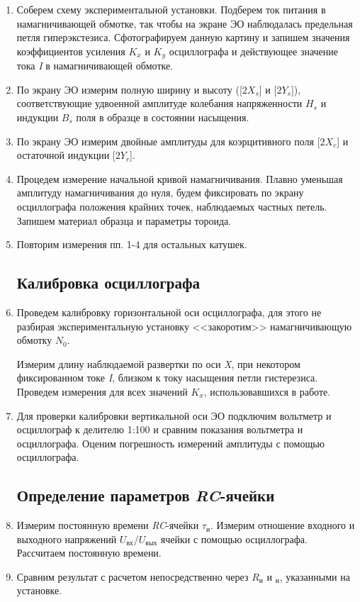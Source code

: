 \documentclass[a4paper, 12pt]{article}%
\begin{document}
\begin{enumerate}

\item Соберем схему экспериментальной установки. Подберем ток питания в намагничивающей обмотке, так чтобы на экране ЭО наблюдалась предельная петля гиперэкстезиса. Сфотографируем данную картину и запишем значения коэффициентов усиления $K_x$ и $K_y$ осциллографа и действующее значение тока \textit{I} в намагничивающей обмотке.

\item По экрану ЭО измерим полную ширину и высоту ([$2X_s$] и [$2Y_s$]), соответствующие удвоенной амплитуде колебания напряженности $H_s$ и индукции $B_s$ поля в образце в состоянии насыщения.

\item По экрану ЭО измерим двойные амплитуды для коэрцитивного поля [$2X_c$] и остаточной индукции [$2Y_r$].

\item Процедем измерение начальной кривой намагничивания. Плавно уменьшая амплитуду намагничивания до нуля, будем фиксировать по экрану осциллографа положения крайних точек, наблюдаемых частных петель. Запишем материал образца и параметры тороида.

\item Повторим измерения пп. 1-4 для остальных катушек.

\subsection*{Калибровка осциллографа}

\item Проведем калибровку горизонтальной оси осциллографа, для этого не разбирая экспериментальную установку <<закоротим>>  намагничивающую обмотку $N_0$.

Измерим длину наблюдаемой развертки по оси \textit{X}, при некотором фиксированном токе \textit{I}, близком к току насыщения петли гистерезиса. Проведем измерения для всех значений $K_x$, использовавшихся в работе.

\item Для проверки калибровки вертикальной оси ЭО подключим вольтметр и осциллограф к делителю 1:100 и сравним показания вольтметра и осциллографа. Оценим погрешность измерений амплитуды с помощью осциллографа.

\subsection*{Определение параметров \textit{RC}-ячейки}

\item Измерим постоянную времени \textit{RC}-ячейки $\tau_{\textit{и}}$. Измерим отношение входного и выходного напряжений $U_{\textit{вх}}/U_{\textit{вых}}$ ячейки с помощью осциллографа. Рассчитаем постоянную времени.

\item Сравним результат с расчетом непосредственно через $R_{\textit{и}}$ и $_{\textit{и}}$, указанными на установке. 

\end{enumerate}
\end{document}
